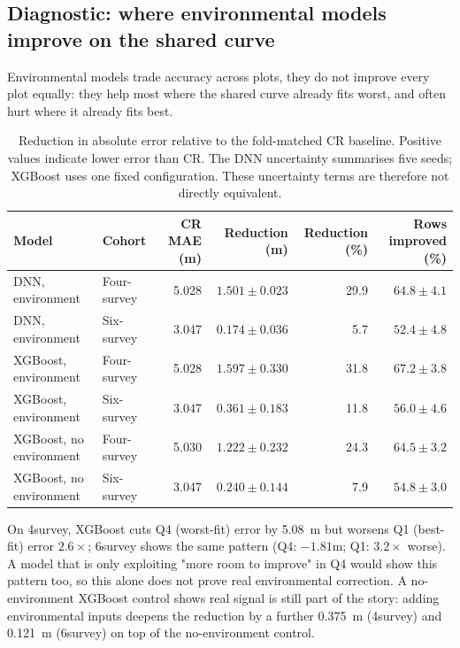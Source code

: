 \subsection{Diagnostic: where environmental models improve on the shared curve}
\label{sec:results-rq1-cr-reduction}

Environmental models trade accuracy across plots, they do not improve every plot equally: they
help most where the shared curve already fits worst, and often hurt where it already fits best.

\begin{table}[!htbp]
\centering
\scriptsize
\renewcommand{\arraystretch}{1.1}
\begin{tabular}{llrrrr}
\toprule
Model & Cohort & CR MAE (m) & Reduction (m) & Reduction (\%) & Rows improved (\%) \\
\midrule
DNN, environment & Four-survey & 5.028 & $1.501\pm0.023$ & 29.9 & $64.8\pm4.1$ \\
DNN, environment & Six-survey & 3.047 & $0.174\pm0.036$ & 5.7 & $52.4\pm4.8$ \\
XGBoost, environment & Four-survey & 5.028 & $1.597\pm0.330$ & 31.8 & $67.2\pm3.8$ \\
XGBoost, environment & Six-survey & 3.047 & $0.361\pm0.183$ & 11.8 & $56.0\pm4.6$ \\
XGBoost, no environment & Four-survey & 5.030 & $1.222\pm0.232$ & 24.3 & $64.5\pm3.2$ \\
XGBoost, no environment & Six-survey & 3.047 & $0.240\pm0.144$ & 7.9 & $54.8\pm3.0$ \\
\bottomrule
\end{tabular}
\caption{Reduction in absolute error relative to the fold-matched CR baseline. Positive values
indicate lower error than CR. The DNN uncertainty summarises five seeds; XGBoost uses one fixed
configuration. These uncertainty terms are therefore not directly equivalent.}
\label{tab:results-cr-reduction}
\end{table}

On 4survey, XGBoost cuts Q4 (worst-fit) error by 5.08~m but worsens Q1 (best-fit) error
$2.6\times$; 6survey shows the same pattern (Q4: $-1.81$m; Q1: $3.2\times$ worse). A model that is
only exploiting "more room to improve" in Q4 would show this pattern too, so this alone does not
prove real environmental correction. A no-environment XGBoost control shows real signal is still
part of the story: adding environmental inputs deepens the reduction by a further 0.375~m
(4survey) and 0.121~m (6survey) on top of the no-environment control.

